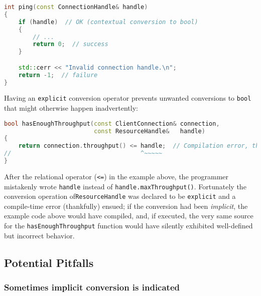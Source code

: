 \begin{lstlisting}[language=C++]
int ping(const ConnectionHandle& handle)
{
    if (handle)  // OK (contextual conversion to bool)
    {
        // ...
        return 0;  // success
    }

    std::cerr << "Invalid connection handle.\n";
    return -1;  // failure
}
\end{lstlisting}
    
\noindent Having an \texttt{explicit} conversion operator prevents unwanted
conversions to \texttt{bool} that might otherwise happen inadvertently:

\begin{lstlisting}[language=C++]
bool hasEnoughThroughput(const ClientConnection& connection,
                         const ResourceHandle&   handle)
{
    return connection.throughput() <= handle;  // Compilation error, thankfully
//                                    ^~~~~~
}
\end{lstlisting}
    
\noindent After the relational operator (\texttt{<=}) in the example above, the
programmer mistakenly wrote \texttt{handle} instead of
\mbox{\texttt{handle.maxThroughput()}}. Fortunately the conversion operation of\linebreak[4] %
\mbox{\texttt{ResourceHandle}} was declared to be \texttt{explicit} and a
compile-time error (thankfully) ensued; if the conversion had
been \emph{implicit}, the example code above would have compiled, and,
if executed, the very same source for the \mbox{\texttt{hasEnoughThroughput}}
function would have silently exhibited well-defined but incorrect
behavior.

\subsection[Potential Pitfalls]{Potential Pitfalls}\label{potential-pitfalls-explicitconv}

\subsubsection[Sometimes implicit conversion is indicated]{Sometimes implicit conversion is indicated}\label{sometimes-implicit-conversion-is-indicated}

